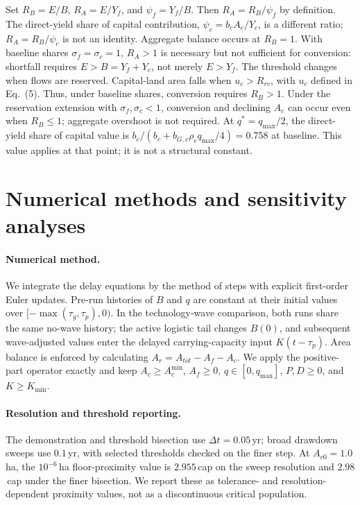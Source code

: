 \documentclass[11pt,a4paper]{article}
\newcommand{\Acmin}{A_c^{\min}}
\begin{document}
Set $R_B=E/B$, $R_A=E/Y_f$, and $\psi_f=Y_f/B$. Then $R_A=R_B/\psi_f$ by definition. The direct-yield share of capital contribution, $\psi_c=b_cA_c/Y_c$, is a different ratio; $R_A=R_B/\psi_c$ is not an identity. Aggregate balance occurs at $R_B=1$. With baseline shares $\sigma_f=\sigma_c=1$, $R_A>1$ is necessary but not sufficient for conversion: shortfall requires $E>B=Y_f+Y_c$, not merely $E>Y_f$. The threshold changes when flows are reserved. Capital-land area falls when $u_c>R_{rc}$, with $u_c$ defined in Eq.~(5). Thus, under baseline shares, conversion requires $R_B>1$. Under the reservation extension with $\sigma_f,\sigma_c<1$, conversion and declining $A_c$ can occur even when $R_B\le1$; aggregate overshoot is not required. At $q^*=q_{\max}/2$, the direct-yield share of capital value is $b_c/(b_c+b_{G,c}\rho_cq_{\max}/4)=0.758$ at baseline. This value applies at that point; it is not a structural constant.
\section{Numerical methods and sensitivity analyses}\label{si:numerics}

\paragraph{Numerical method.} We integrate the delay equations by the method of steps with explicit first-order Euler updates. Pre-run histories of $B$ and $q$ are constant at their initial values over $[-\max(\tau_g,\tau_p),0)$. In the technology-wave comparison, both runs share the same no-wave history; the active logistic tail changes $B(0)$, and subsequent wave-adjusted values enter the delayed carrying-capacity input $K(t-\tau_p)$. Area balance is enforced by calculating $A_r=A_{tot}-A_f-A_c$. We apply the positive-part operator exactly and keep $A_c\ge\Acmin$, $A_f\ge0$, $q\in[0,q_{\max}]$, $P,D\ge0$, and $K\ge K_{\min}$.

\paragraph{Resolution and threshold reporting.} The demonstration and threshold bisection use $\Delta t=0.05$\,yr; broad drawdown sweeps use $0.1$\,yr, with selected thresholds checked on the finer step. At $A_{c0}=1.0$\,ha, the $10^{-6}$\,ha floor-proximity value is $2.955$\,cap on the sweep resolution and $2.98$\,cap under the finer bisection. We report these as tolerance- and resolution-dependent proximity values, not as a discontinuous critical population.
\end{document}
